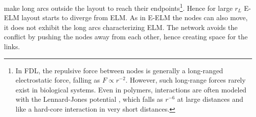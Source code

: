 \documentclass[nofootinbib,preprint,floatfix,titlepage,endfloats]{revtex4} %
\begin{document}
make long arcs outside the layout to reach their 
endpoints\footnote{In FDL, the repulsive force between nodes is generally a long-ranged electrostatic force, falling as $F \propto r^{-2}$. 
However, such long-range forces rarely exist in biological systems. Even in polymers, interactions are often modeled with the Lennard-Jones potential \cite{lennard1924determination}, which falls as $r^{-6}$ at large distances and like a hard-core interaction in very short distances.}.
Hence for large $r_L$ E-ELM layout starts to diverge from ELM. As in E-ELM the nodes can also move, it does not exhibit the long arcs characterizing ELM. The network avoids the conflict by pushing the nodes away from each other, hence creating space for the links.
%
\end{document}
